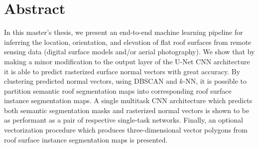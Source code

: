 \chapter*{Abstract}

In this master's thesis, we present an end-to-end machine learning pipeline for inferring the location, orientation, and elevation of flat roof surfaces from remote sensing data (digital surface models and/or aerial photography).
We show that by making a minor modification to the output layer of the U-Net CNN architecture it is able to predict rasterized surface normal vectors with great accuracy.
By clustering predicted normal vectors, using DBSCAN and $k$-NN, it is possible to partition semantic roof segmentation maps into corresponding roof surface instance segmentation maps.
A single multitask CNN architecture which predicts both semantic segmentation masks and rasterized normal vectors is shown to be as performant as a pair of respective single-task networks.
Finally, an optional vectorization procedure which produces three-dimensional vector polygons from roof surface instance segmentation maps is presented.
